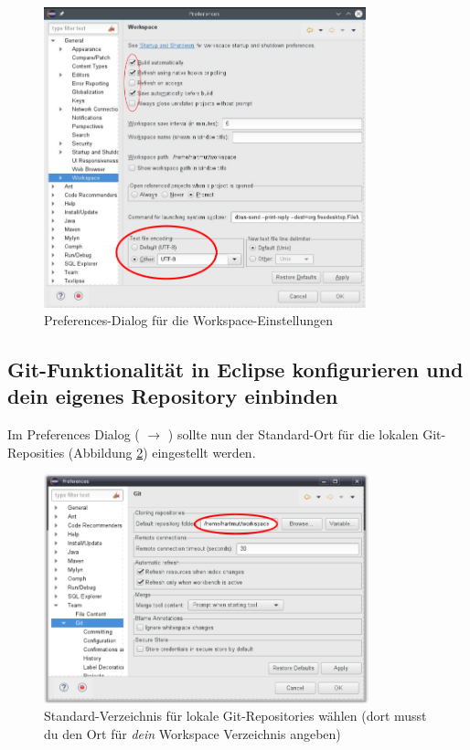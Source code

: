 \begin{figure}[h]
  \centering
  \includegraphics[width=0.83\textwidth]{./inf/SEKII/01_Vorbereitung/Eclipse-Workspace-Preferences.png}
  \caption{Preferences-Dialog für die Workspace-Einstellungen}
  \label{fig:eclipse-workspace-preferences}
\end{figure}

\subsection{Git-Funktionalität in Eclipse konfigurieren und dein eigenes
Repository einbinden}

Im Preferences Dialog ( $\rightarrow$ ) sollte
nun der Standard-Ort für die lokalen Git-Reposities (Abbildung
\ref{fig:eclipse-git-configuration-1}) 
eingestellt werden.

\begin{figure}[h]
  \centering
  \includegraphics[width=0.84\textwidth]{./inf/SEKII/01_Vorbereitung/Eclipse-Git-Configuration-1.png}
  \caption{Standard-Verzeichnis für lokale Git-Repositories wählen (dort musst
  du den Ort für \emph{dein} Workspace Verzeichnis angeben)}
  \label{fig:eclipse-git-configuration-1}
\end{figure}

